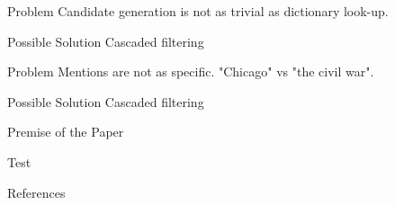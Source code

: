 \begin{frame}

\begin{block}{Problem}
Candidate generation is not as trivial as dictionary look-up.
\end{block}

\begin{exampleblock}{Possible Solution}
Cascaded filtering
\end{exampleblock}
\begin{block}{Problem}
Mentions are not as specific. "Chicago" vs "the civil war".
\end{block}
\begin{exampleblock}{Possible Solution}
Cascaded filtering
\end{exampleblock}

\end{frame}


\begin{frame}{Premise of the Paper}
  \begin{example}
    Test
  \end{example}
\end{frame}






\begin{frame}[allowframebreaks]{References}
  \def\newblock{}
  
  
\end{frame}


